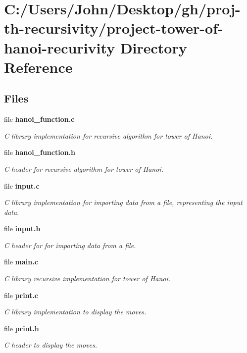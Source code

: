 \section{C\+:/\+Users/\+John/\+Desktop/gh/proj-\/th-\/recursivity/project-\/tower-\/of-\/hanoi-\/recurivity Directory Reference}
\label{dir_fe34cba08aa8e82a81ee1707b49fea5a}
\subsection*{Files}
\begin{DoxyCompactItemize}
\item 
file \textbf{ hanoi\+\_\+function.\+c}
\begin{DoxyCompactList}\small\item\em C library implementation for recursive algorithm for tower of Hanoi. \end{DoxyCompactList}\item 
file \textbf{ hanoi\+\_\+function.\+h}
\begin{DoxyCompactList}\small\item\em C header for recursive algorithm for tower of Hanoi. \end{DoxyCompactList}\item 
file \textbf{ input.\+c}
\begin{DoxyCompactList}\small\item\em C library implementation for importing data from a file, representing the input data. \end{DoxyCompactList}\item 
file \textbf{ input.\+h}
\begin{DoxyCompactList}\small\item\em C header for for importing data from a file. \end{DoxyCompactList}\item 
file \textbf{ main.\+c}
\begin{DoxyCompactList}\small\item\em C library recursive implementation for tower of Hanoi. \end{DoxyCompactList}\item 
file \textbf{ print.\+c}
\begin{DoxyCompactList}\small\item\em C library implementation to display the moves. \end{DoxyCompactList}\item 
file \textbf{ print.\+h}
\begin{DoxyCompactList}\small\item\em C header to display the moves. \end{DoxyCompactList}\end{DoxyCompactItemize}

